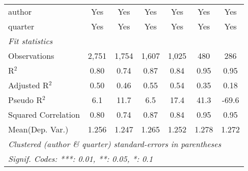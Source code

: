 \begin{tabular}{lcccccc}
   author                                                     & Yes          & Yes           & Yes            & Yes            & Yes         & Yes\\  
   quarter                                                    & Yes          & Yes           & Yes            & Yes            & Yes         & Yes\\  
   \midrule
   \emph{Fit statistics}\\
   Observations                                               & 2,751        & 1,754         & 1,607          & 1,025          & 480         & 286\\  
   R$^2$                                                      & 0.80         & 0.74          & 0.87           & 0.84           & 0.95        & 0.95\\  
   Adjusted R$^2$                                             & 0.50         & 0.46          & 0.55           & 0.54           & 0.35        & 0.18\\  
   Pseudo R$^2$                                               & 6.1          & 11.7          & 6.5            & 17.4           & 41.3        & -69.6\\  
   Squared Correlation                                        & 0.80         & 0.74          & 0.87           & 0.84           & 0.95        & 0.95\\  
Mean(Dep. Var.) & 1.256 & 1.247 & 1.265 & 1.252 & 1.278 & 1.272 \\
   \midrule \midrule
   \multicolumn{7}{l}{\emph{Clustered (author \& quarter) standard-errors in parentheses}}\\
   \multicolumn{7}{l}{\emph{Signif. Codes: ***: 0.01, **: 0.05, *: 0.1}}\\
\end{tabular}
\par\endgroup
